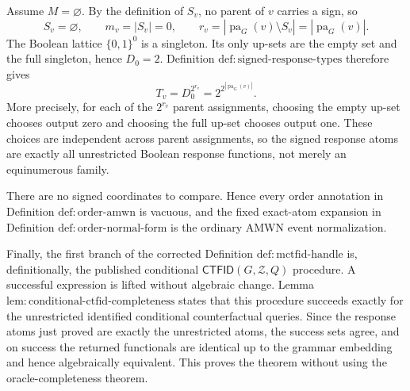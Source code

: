 Assume \(M=\varnothing\).  By the definition of \(S_v\), no parent of \(v\) carries a sign, so
\[
 S_v=\varnothing,
 \qquad m_v=|S_v|=0,
 \qquad r_v=|\operatorname{pa}_G(v)\setminus S_v|
 =|\operatorname{pa}_G(v)|.
\]
The Boolean lattice \(\{0,1\}^0\) is a singleton.  Its only up-sets are the empty set and the full singleton, hence \(D_0=2\).  Definition \(\mathrm{def:signed\text{-}response\text{-}types}\) therefore gives
\[
 T_v=D_0^{2^{r_v}}
 =2^{2^{|\operatorname{pa}_G(v)|}}.
\]
More precisely, for each of the \(2^{r_v}\) parent assignments, choosing the empty up-set chooses output zero and choosing the full up-set chooses output one.  These choices are independent across parent assignments, so the signed response atoms are exactly all unrestricted Boolean response functions, not merely an equinumerous family.

There are no signed coordinates to compare.  Hence every order annotation in Definition \(\mathrm{def:order\text{-}amwn}\) is vacuous, and the fixed exact-atom expansion in Definition \(\mathrm{def:order\text{-}normal\text{-}form}\) is the ordinary AMWN event normalization.

Finally, the first branch of the corrected Definition \(\mathrm{def:mctfid\text{-}handle}\) is, definitionally, the published conditional \(\mathsf{CTFID}(G,\mathcal Z,Q)\) procedure.  A successful expression is lifted without algebraic change.  Lemma \(\mathrm{lem:conditional\text{-}ctfid\text{-}completeness}\) states that this procedure succeeds exactly for the unrestricted identified conditional counterfactual queries.  Since the response atoms just proved are exactly the unrestricted atoms, the success sets agree, and on success the returned functionals are identical up to the grammar embedding and hence algebraically equivalent.  This proves the theorem without using the oracle-completeness theorem.
